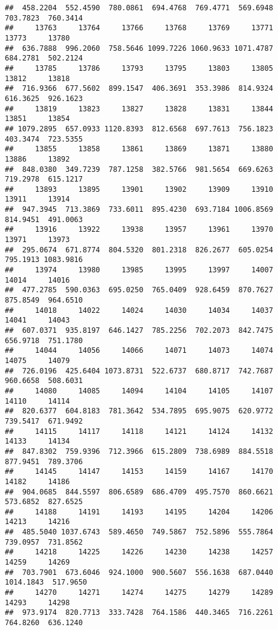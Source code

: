 \documentclass[
]{article}
\begin{document}
\begin{verbatim}
##  458.2204  552.4590  780.0861  694.4768  769.4771  569.6948  703.7823  760.3414 
##     13763     13764     13766     13768     13769     13771     13773     13780 
##  636.7888  996.2060  758.5646 1099.7226 1060.9633 1071.4787  684.2781  502.2124 
##     13785     13786     13793     13795     13803     13805     13812     13818 
##  716.9366  677.5602  899.1547  406.3691  353.3986  814.9324  616.3625  926.1623 
##     13819     13823     13827     13828     13831     13844     13851     13854 
## 1079.2895  657.0933 1120.8393  812.6568  697.7613  756.1823  403.3474  723.5355 
##     13855     13858     13861     13869     13871     13880     13886     13892 
##  848.0380  349.7239  787.1258  382.5766  981.5654  669.6263  719.2978  615.1217 
##     13893     13895     13901     13902     13909     13910     13911     13914 
##  947.3945  713.3869  733.6011  895.4230  693.7184 1006.8569  814.9451  491.0063 
##     13916     13922     13938     13957     13961     13970     13971     13973 
##  295.0674  671.8774  804.5320  801.2318  826.2677  605.0254  795.1913 1083.9816 
##     13974     13980     13985     13995     13997     14007     14014     14016 
##  477.2785  590.0363  695.0250  765.0409  928.6459  870.7627  875.8549  964.6510 
##     14018     14022     14024     14030     14034     14037     14041     14043 
##  607.0371  935.8197  646.1427  785.2256  702.2073  842.7475  656.9718  751.1780 
##     14044     14056     14066     14071     14073     14074     14075     14079 
##  726.0196  425.6404 1073.8731  522.6737  680.8717  742.7687  960.6658  508.6031 
##     14080     14085     14094     14104     14105     14107     14110     14114 
##  820.6377  604.8183  781.3642  534.7895  695.9075  620.9772  739.5417  671.9492 
##     14115     14117     14118     14121     14124     14132     14133     14134 
##  847.8302  759.9396  712.3966  615.2809  738.6989  884.5518  877.9451  789.3706 
##     14145     14147     14153     14159     14167     14170     14182     14186 
##  904.0685  844.5597  806.6589  686.4709  495.7570  860.6621  573.6852  827.6525 
##     14188     14191     14193     14195     14204     14206     14213     14216 
##  485.5040 1037.6743  589.4650  749.5867  752.5896  555.7864  739.0957  731.8562 
##     14218     14225     14226     14230     14238     14257     14259     14269 
##  703.7901  673.6046  924.1000  900.5607  556.1638  687.0440 1014.1843  517.9650 
##     14270     14271     14274     14275     14279     14289     14293     14298 
##  973.9174  820.7713  333.7428  764.1586  440.3465  716.2261  764.8260  636.1240 

\end{verbatim}
\end{document}
